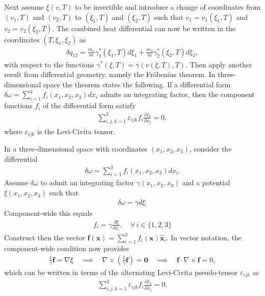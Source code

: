Next assume $\xi(v,T)$ to be invertible and introduce a change of coordinates from $(v_1,T)$ and $(v_2,T)$ to $(\xi_1,T)$ and $(\xi_2,T)$ such that $v_1=v_1(\xi_1,T)$ and $v_2=v_2(\xi_2,T)$. The combined heat differential can now be written in the coordinates $(T,\xi_1,\xi_2)$ as
\begin{align}\label{eq:delta-q12-xi1-xi2-T}
    \delta q_{12}=\frac{m_1}{m}\gamma_1^\ast(\xi_1,T)d\xi_1+\frac{m_2}{m}\gamma_2^\ast(\xi_2,T)d\xi_2,
\end{align}
with respect to the functions $\gamma^\ast(\xi,T)=\gamma(v(\xi,T),T)$. Then apply another result from differential geometry, namely the Fröbenius theorem. In three-dimensional space the theorem states the following. If a differential form $\delta\omega =\sum_{i=1}^3f_i(x_1,x_2,x_3)dx_i$ admits an integrating factor, then the component functions $f_i$ of the differential form satisfy
\begin{align}\label{eq:frobenius-3d}
    \sum_{i,j,k=1}^{3}\varepsilon_{ijk}f_i\frac{\partial f_k}{\partial x_j}=0,
\end{align}
where $\varepsilon_{ijk}$ is the Levi-Civita tensor. 
\begin{example}
    In a three-dimensional space with coordinates $(x_1,x_2,x_3)$, consider the differential 
    \begin{align*}
        \delta \omega=\sum_{i=1}^3 f_i(x_1,x_2,x_3)dx_i.
    \end{align*} 
    Assume $\delta \omega$ to admit an integrating factor $\gamma(x_1,x_2,x_3)$ and a potential $\xi(x_1,x_2,x_3)$ such that 
    \begin{align*}
        \delta\omega=\gamma d\xi.
    \end{align*}
    Component-wide this equals
    \begin{align*}
         f_i=\gamma\frac{\partial \xi}{\partial x_i}, \quad \forall\, i\in\{1,2,3\}
    \end{align*}
    Construct then the vector $\bm{f}(\bm{x})=\sum_{i=1}^3f_i(\bm{x})\bm{\hat{x}}_i$. In vector notation, the component-wide condition now provides
    \begin{align*}
        \frac{1}{\gamma}\bm{f}=\nabla\xi \quad\implies\quad \nabla\times\left(\frac{1}{\gamma}\bm{f}\right)=\bm{0} \quad\implies\quad \bm{f}\cdot\nabla\times\bm{f}=0,
    \end{align*}
    which can be written in terms of the alternating Levi-Civita pseudo-tensor $\varepsilon_{ijk}$ as
    \begin{align*}
        \sum_{i,j,k=1}^{3}\varepsilon_{ijk}f_i\frac{\partial f_k}{\partial x_j}=0.
    \end{align*}
\end{example}
